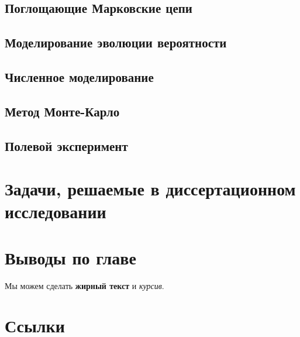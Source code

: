 \subsection{Поглощающие Марковские цепи}\label{subsec:ch1/sec3/sub2}
\subsection{Моделирование эволюции вероятности}\label{subsec:ch1/sec3/sub3}
\subsection{Численное моделирование}\label{subsec:ch1/sec3/sub4}
\subsection{Метод Монте-Карло}\label{subsec:ch1/sec3/sub5}
\subsection{Полевой эксперимент}\label{subsec:ch1/sec3/sub6}

\section{Задачи, решаемые в диссертационном исследовании}\label{sec:ch1/sec4}

\section{Выводы по главе}\label{sec:ch1/sec5}

















Мы можем сделать \textbf{жирный текст} и \textit{курсив}.

\section{Ссылки}\label{sec:ch1/sec2}

